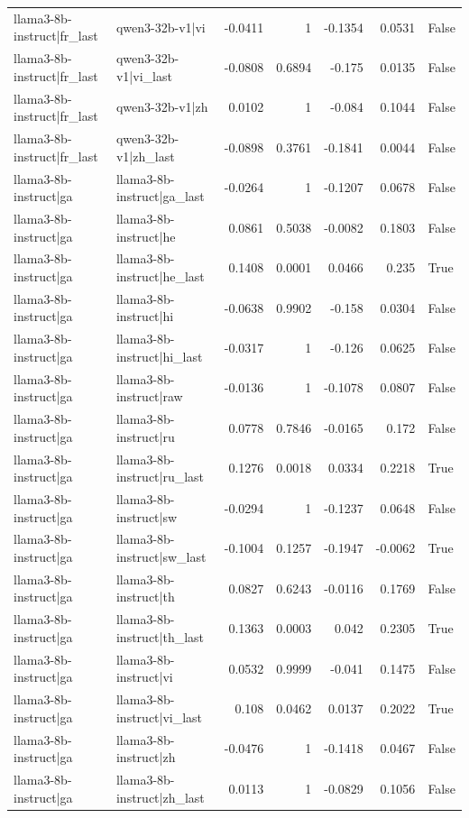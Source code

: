 \begin{table}
\begin{tabular}{l l r r r r l}
llama3-8b-instruct|fr_last & qwen3-32b-v1|vi & -0.0411 & 1 & -0.1354 & 0.0531 & False \\
llama3-8b-instruct|fr_last & qwen3-32b-v1|vi_last & -0.0808 & 0.6894 & -0.175 & 0.0135 & False \\
llama3-8b-instruct|fr_last & qwen3-32b-v1|zh & 0.0102 & 1 & -0.084 & 0.1044 & False \\
llama3-8b-instruct|fr_last & qwen3-32b-v1|zh_last & -0.0898 & 0.3761 & -0.1841 & 0.0044 & False \\
llama3-8b-instruct|ga & llama3-8b-instruct|ga_last & -0.0264 & 1 & -0.1207 & 0.0678 & False \\
llama3-8b-instruct|ga & llama3-8b-instruct|he & 0.0861 & 0.5038 & -0.0082 & 0.1803 & False \\
llama3-8b-instruct|ga & llama3-8b-instruct|he_last & 0.1408 & 0.0001 & 0.0466 & 0.235 & True \\
llama3-8b-instruct|ga & llama3-8b-instruct|hi & -0.0638 & 0.9902 & -0.158 & 0.0304 & False \\
llama3-8b-instruct|ga & llama3-8b-instruct|hi_last & -0.0317 & 1 & -0.126 & 0.0625 & False \\
llama3-8b-instruct|ga & llama3-8b-instruct|raw & -0.0136 & 1 & -0.1078 & 0.0807 & False \\
llama3-8b-instruct|ga & llama3-8b-instruct|ru & 0.0778 & 0.7846 & -0.0165 & 0.172 & False \\
llama3-8b-instruct|ga & llama3-8b-instruct|ru_last & 0.1276 & 0.0018 & 0.0334 & 0.2218 & True \\
llama3-8b-instruct|ga & llama3-8b-instruct|sw & -0.0294 & 1 & -0.1237 & 0.0648 & False \\
llama3-8b-instruct|ga & llama3-8b-instruct|sw_last & -0.1004 & 0.1257 & -0.1947 & -0.0062 & True \\
llama3-8b-instruct|ga & llama3-8b-instruct|th & 0.0827 & 0.6243 & -0.0116 & 0.1769 & False \\
llama3-8b-instruct|ga & llama3-8b-instruct|th_last & 0.1363 & 0.0003 & 0.042 & 0.2305 & True \\
llama3-8b-instruct|ga & llama3-8b-instruct|vi & 0.0532 & 0.9999 & -0.041 & 0.1475 & False \\
llama3-8b-instruct|ga & llama3-8b-instruct|vi_last & 0.108 & 0.0462 & 0.0137 & 0.2022 & True \\
llama3-8b-instruct|ga & llama3-8b-instruct|zh & -0.0476 & 1 & -0.1418 & 0.0467 & False \\
llama3-8b-instruct|ga & llama3-8b-instruct|zh_last & 0.0113 & 1 & -0.0829 & 0.1056 & False \\

\end{tabular}
\end{table}
